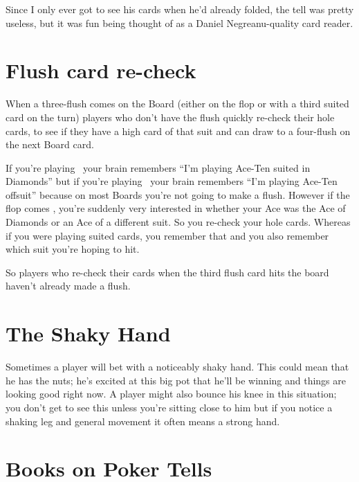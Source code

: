Since I only ever got to see his cards when he'd already folded, the tell
was pretty useless, but it was fun being thought of as a Daniel
Negreanu-quality card reader.


\section{Flush card re-check}

When a three-flush comes on the Board (either on the flop or with
a third suited card on the turn) players who don't have the flush
quickly re-check their hole cards, to see if they have a high card
of that suit and can draw to a four-flush on the next Board card.

If you're playing \Ad\tend\ your brain remembers ``I'm playing Ace-Ten
suited in Diamonds'' but if you're playing \Ad\tens\ your brain remembers
``I'm playing Ace-Ten offsuit'' because on most Boards you're not going to
make a flush. However if the flop comes \Kd\eigd\sevd, you're suddenly
very interested in whether your Ace was the Ace of Diamonds or an Ace of
a different suit. So you re-check your hole cards. Whereas if you were
playing suited cards, you remember that and you also remember which suit
you're hoping to hit.

So players who re-check their cards when the third flush card hits the
board haven't already made a flush.

\section{The Shaky Hand}

Sometimes a player will bet with a noticeably shaky hand. This could
mean that he has the nuts; he's excited at this big pot that he'll be
winning and things are looking good right now. A player might also
bounce his knee in this situation; you don't get to see this unless
you're sitting close to him but if you notice a shaking leg and
general movement it often means a strong hand.

\section{Books on Poker Tells}

